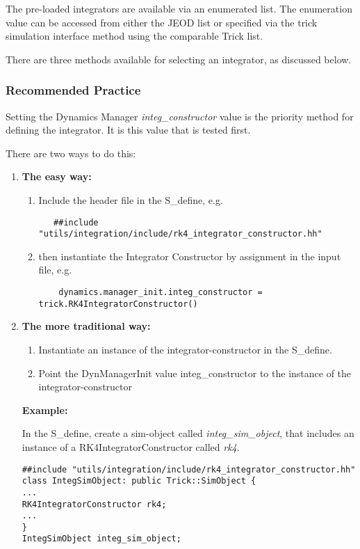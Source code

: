 The pre-loaded integrators are available via an enumerated list.  The
enumeration value can be accessed from either the JEOD list or specified via
the trick simulation interface method using the comparable
Trick list.

There are three methods available for selecting an integrator, as discussed
below.

\subsubsection {Recommended Practice}

Setting the Dynamics Manager \textit{integ\_constructor} value is the priority
method for defining the integrator.  It is this value that is tested first.

There are two ways to do this:
\begin{enumerate}
 \item \textbf{The easy way:} \newline
 \begin{enumerate}
  \item Include the header file in the S\_define, e.g.
   \begin{verbatim}
   ##include "utils/integration/include/rk4_integrator_constructor.hh"
   \end{verbatim}
   \item then instantiate the Integrator Constructor by assignment in the
     input file, e.g.
   \begin{verbatim}
    dynamics.manager_init.integ_constructor = trick.RK4IntegratorConstructor()
   \end{verbatim}
 \end{enumerate}



 \item \textbf{The more traditional way:} \newline
 \begin{enumerate}
  \item Instantiate an instance of the integrator-constructor in the S\_define.
  \item Point the DynManagerInit value integ\_constructor to the instance of
  the integrator-constructor
 \end{enumerate}

\textbf{Example:}

In the S\_define, create a sim-object called \textit{integ\_sim\_object}, that
includes an instance of a RK4IntegratorConstructor called \textit{rk4}.
\begin{verbatim}
##include "utils/integration/include/rk4_integrator_constructor.hh"
class IntegSimObject: public Trick::SimObject {
...
RK4IntegratorConstructor rk4;
...
}
IntegSimObject integ_sim_object;
\end{verbatim}


\end{enumerate}
